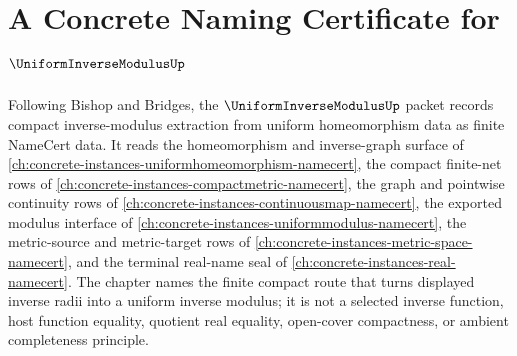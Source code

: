\chapter{A Concrete Naming Certificate for $\UniformInverseModulusUp$}
\label{ch:concrete-instances-uniform-inverse-modulus-namecert}

Following Bishop and Bridges, the $\UniformInverseModulusUp$ packet records compact inverse-modulus extraction from uniform homeomorphism data as finite NameCert data. It reads the homeomorphism and inverse-graph surface of \autoref{ch:concrete-instances-uniformhomeomorphism-namecert}, the compact finite-net rows of \autoref{ch:concrete-instances-compactmetric-namecert}, the graph and pointwise continuity rows of \autoref{ch:concrete-instances-continuousmap-namecert}, the exported modulus interface of \autoref{ch:concrete-instances-uniformmodulus-namecert}, the metric-source and metric-target rows of \autoref{ch:concrete-instances-metric-space-namecert}, and the terminal real-name seal of \autoref{ch:concrete-instances-real-namecert}. The chapter names the finite compact route that turns displayed inverse radii into a uniform inverse modulus; it is not a selected inverse function, host function equality, quotient real equality, open-cover compactness, or ambient completeness principle.

